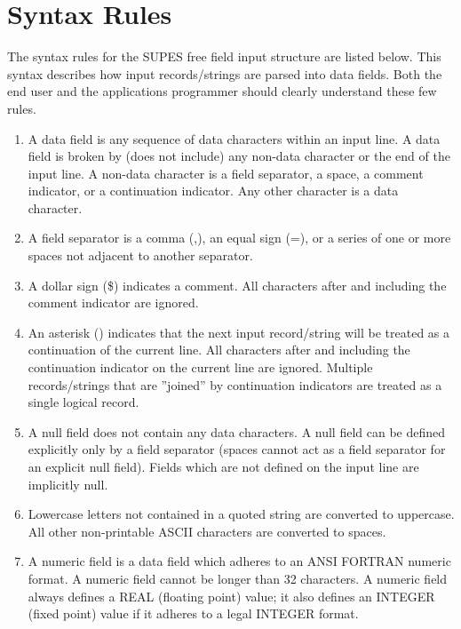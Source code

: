 \section{Syntax Rules} \label{sec:syntax}
The syntax rules for the SUPES free field input structure are listed below.
This syntax describes how input records/strings are parsed into data fields.  Both
the end user and the applications programmer should clearly understand these
few rules.
\begin{enumerate}
\item A data field is any sequence of data characters within an input line.  A
   data field is broken by (does not include) any non-data character or the
   end of the input line.  A non-data character is a field separator, a
   space, a comment indicator, or a continuation indicator.  Any other
   character is a data character.

\item A field separator is a comma (,), an equal sign (=), or a series of one
   or more spaces not adjacent to another separator.

\item A dollar sign (\$) indicates a comment.  All characters after and
   including the comment indicator are ignored.

\item An asterisk (\last) indicates that the next input record/string will be
treated as a continuation of the current line.  All characters after and
including the continuation indicator on the current line are ignored.
Multiple records/strings that are ''joined'' by continuation indicators
are treated as a single logical record.

\item A null field does not contain any data characters.  A null field can be
   defined explicitly only by a field separator (spaces cannot act as a
   field separator for an explicit null field).  Fields which are not
   defined on the input line are implicitly null.

\item \label{itm:case} Lowercase letters not contained in a quoted string
                       are converted to uppercase.  All
                       other non-printable ASCII characters are converted
                       to spaces.

\item A numeric field is a data field which adheres to an ANSI FORTRAN numeric
   format.  A numeric field cannot be longer than 32 characters.  A numeric
   field always defines a REAL (floating point) value; it also defines an
   INTEGER (fixed point) value if it adheres to a legal INTEGER format.


\end{enumerate}
